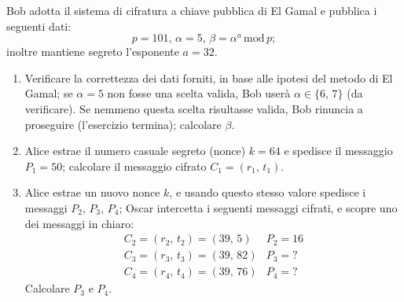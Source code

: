         Bob adotta il sistema di cifratura a chiave pubblica di El Gamal e pubblica i seguenti dati: \[
            p=101,\, \alpha=5,\, \beta= \alpha^{a} \,\mathrm{mod}\, p
        ;\] inoltre mantiene segreto l'esponente $a=32$.
        \begin{enumerate}
            \item Verificare la correttezza dei dati forniti, in base alle ipotesi del metodo di 
                El Gamal; se $\alpha=5$ non fosse una scelta valida, Bob userà $\alpha\in\{6,\,7\}$ 
                (da verificare). Se nemmeno questa scelta risultasse valida, Bob rinuncia a proseguire 
                (l'esercizio termina); calcolare $\beta$.
            \item Alice estrae il numero casuale segreto (nonce) $k=64$ e spedisce il messaggio $P_1=50$; 
                calcolare il messaggio cifrato $C_1=(r_1,\,t_1)$.
            \item Alice estrae un nuovo nonce $k$, e usando questo stesso valore spedisce i messaggi 
                $P_2,\,P_3,\,P_4$; Oscar intercetta i seguenti messaggi cifrati, e scopre uno dei messaggi 
                in chiaro: \[
                \begin{array}{ll}
                    C_2=(r_2,\,t_2)=(39,\,5) & P_2=16\\
                    C_3=(r_3,\,t_3)=(39,\,82) & P_3=?\\
                    C_4=(r_4,\,t_4)=(39,\,76) & P_4=?
                \end{array}
                \] Calcolare $P_3$ e $P_4$.
        \end{enumerate}


